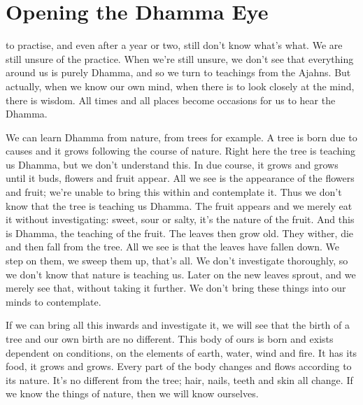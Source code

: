 
\chapter{Opening the Dhamma Eye}

\vspace*{0.5\baselineskip}
 to practise, and even after a year or two, still don't know what's what. We are still unsure of the practice. When we're still unsure, we don't see that everything around us is purely Dhamma, and so we turn to teachings from the Ajahns. But actually, when we know our own mind, when there is  to look closely at the mind, there is wisdom. All times and all places become occasions for us to hear the Dhamma.

We can learn Dhamma from nature, from trees for example. A tree is born due to causes and it grows following the course of nature. Right here the tree is teaching us Dhamma, but we don't understand this. In due course, it grows and grows until it buds, flowers and fruit appear. All we see is the appearance of the flowers and fruit; we're unable to bring this within and contemplate it. Thus we don't know that the tree is teaching us Dhamma. The fruit appears and we merely eat it without investigating: sweet, sour or salty, it's the nature of the fruit. And this is Dhamma, the teaching of the fruit. The leaves then grow old. They wither, die and then fall from the tree. All we see is that the leaves have fallen down. We step on them, we sweep them up, that's all. We don't investigate thoroughly, so we don't know that nature is teaching us. Later on the new leaves sprout, and we merely see that, without taking it further. We don't bring these things into our minds to contemplate.

If we can bring all this inwards and investigate it, we will see that the birth of a tree and our own birth are no different. This body of ours is born and exists dependent on conditions, on the elements of earth, water, wind and fire. It has its food, it grows and grows. Every part of the body changes and flows according to its nature. It's no different from the tree; hair, nails, teeth and skin all change. If we know the things of nature, then we will know ourselves.

